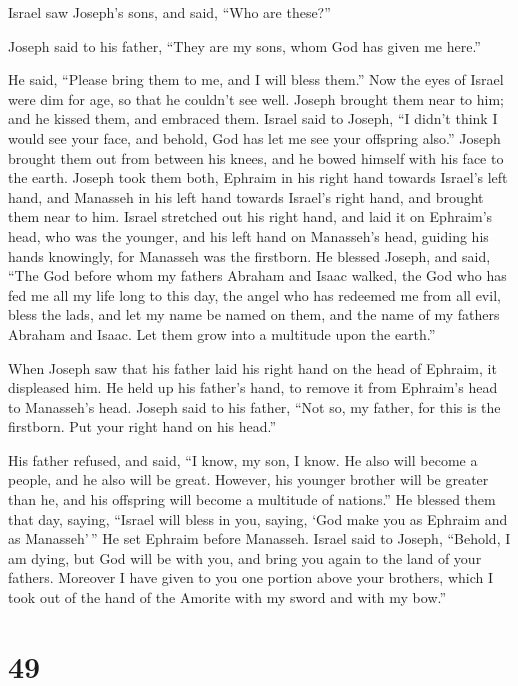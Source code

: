  Israel saw Joseph's sons, and said, ``Who are these?''

 Joseph said to his father, ``They are my sons, whom God
has given me here.''

He said, ``Please bring them to me, and I will bless them.''
 Now the eyes of Israel were dim for age, so that he
couldn't see well. Joseph brought them near to him; and he kissed them,
and embraced them.  Israel said to Joseph, ``I didn't
think I would see your face, and behold, God has let me see your
offspring also.''  Joseph brought them out from between
his knees, and he bowed himself with his face to the earth.
 Joseph took them both, Ephraim in his right hand towards
Israel's left hand, and Manasseh in his left hand towards Israel's right
hand, and brought them near to him.  Israel stretched out
his right hand, and laid it on Ephraim's head, who was the younger, and
his left hand on Manasseh's head, guiding his hands knowingly, for
Manasseh was the firstborn.  He blessed Joseph, and said,
``The God before whom my fathers Abraham and Isaac walked, the God who
has fed me all my life long to this day,  the angel who
has redeemed me from all evil, bless the lads, and let my name be named
on them, and the name of my fathers Abraham and Isaac. Let them grow
into a multitude upon the earth.''

 When Joseph saw that his father laid his right hand on
the head of Ephraim, it displeased him. He held up his father's hand, to
remove it from Ephraim's head to Manasseh's head.  Joseph
said to his father, ``Not so, my father, for this is the firstborn. Put
your right hand on his head.''

 His father refused, and said, ``I know, my son, I know.
He also will become a people, and he also will be great. However, his
younger brother will be greater than he, and his offspring will become a
multitude of nations.''  He blessed them that day,
saying, ``Israel will bless in you, saying, `God make you as Ephraim and
as Manasseh'\,'' He set Ephraim before Manasseh.  Israel
said to Joseph, ``Behold, I am dying, but God will be with you, and
bring you again to the land of your fathers.  Moreover I
have given to you one portion above your brothers, which I took out of
the hand of the Amorite with my sword and with my bow.''

\hypertarget{section-48}{%
\section{49}\label{section-48}}

